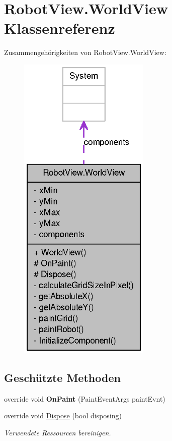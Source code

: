 \hypertarget{class_robot_view_1_1_world_view}{
\section{RobotView.WorldView Klassenreferenz}
\label{class_robot_view_1_1_world_view}
}


Zusammengehörigkeiten von RobotView.WorldView:\nopagebreak
\begin{figure}[H]
\begin{center}
\leavevmode
\includegraphics[width=178pt]{class_robot_view_1_1_world_view__coll__graph}
\end{center}
\end{figure}
\subsection*{Geschützte Methoden}
\begin{DoxyCompactItemize}
\item 
\hypertarget{class_robot_view_1_1_world_view_ad50b0a0a0c4bdc7e027eb536db6bba35}{
override void {\bfseries OnPaint} (PaintEventArgs paintEvnt)}
\label{class_robot_view_1_1_world_view_ad50b0a0a0c4bdc7e027eb536db6bba35}

\item 
override void \hyperlink{class_robot_view_1_1_world_view_ae412a0d88561b075a22955c6e0b41aca}{Dispose} (bool disposing)
\begin{DoxyCompactList}\small\item\em Verwendete Ressourcen bereinigen. \item\end{DoxyCompactList}\end{DoxyCompactItemize}


